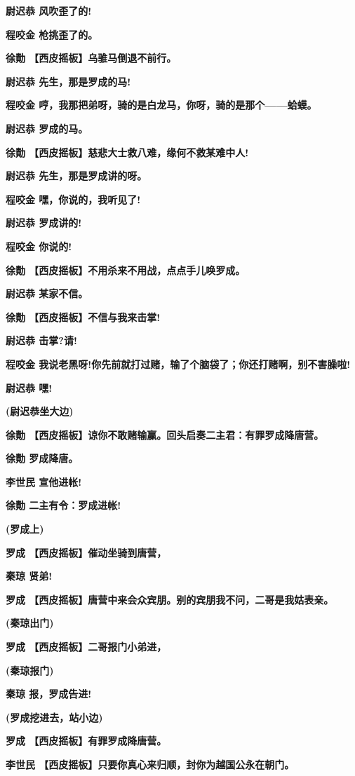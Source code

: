 \textbf{尉迟恭 风吹歪了的!}

\textbf{程咬金 枪挑歪了的。}

\textbf{徐勣 【西皮摇板】乌骓马倒退不前行。}

\textbf{尉迟恭 先生，那是罗成的马!}

\textbf{程咬金
哼，我那把弟呀，骑的是白龙马，你呀，骑的是那个------蛤蟆。}

\textbf{尉迟恭 罗成的马。}

\textbf{徐勣 【西皮摇板】慈悲大士救八难，缘何不救某难中人!}

\textbf{尉迟恭 先生，那是罗成讲的呀。}

\textbf{程咬金 嘿，你说的，我听见了!}

\textbf{尉迟恭 罗成讲的!}

\textbf{程咬金 你说的!}

\textbf{徐勣 【西皮摇板】不用杀来不用战，点点手儿唤罗成。}

\textbf{尉迟恭 某家不信。}

\textbf{徐勣 【西皮摇板】不信与我来击掌!}

\textbf{尉迟恭 击掌?请!}

\textbf{程咬金
我说老黑呀!你先前就打过赌，输了个脑袋了；你还打赌啊，别不害臊啦!}

\textbf{尉迟恭 嘿!}

\textbf{(尉迟恭坐大边)}

\textbf{徐勣
【西皮摇板】谅你不敢赌输赢。回头启奏二主君：有罪罗成降唐营。}

\textbf{徐勣 罗成降唐。}

\textbf{李世民 宣他进帐!}

\textbf{徐勣 二主有令：罗成进帐!}

\textbf{(罗成上)}

\textbf{罗成 【西皮摇板】催动坐骑到唐营，}

\textbf{秦琼 贤弟!}

\textbf{罗成
【西皮摇板】唐营中来会众宾朋。别的宾朋我不问，二哥是我姑表亲。}

\textbf{(秦琼出门)}

\textbf{罗成 【西皮摇板】二哥报门小弟进，}

\textbf{(秦琼报门)}

\textbf{秦琼 报，罗成告进!}

\textbf{(罗成挖进去，站小边)}

\textbf{罗成 【西皮摇板】有罪罗成降唐营。}

\textbf{李世民 【西皮摇板】只要你真心来归顺，封你为越国公永在朝门。}

